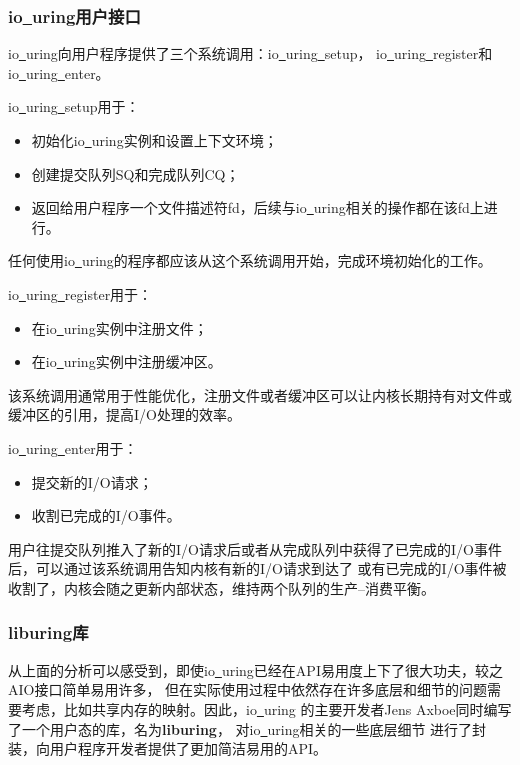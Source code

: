 \documentclass[supercite]{HustGraduPaper}
\theoremstyle{definition}
\begin{document}
\subsubsection{io\underline{~}uring用户接口}

io\underline{~}uring向用户程序提供了三个系统调用：io\underline{~}uring\underline{~}setup，
io\underline{~}uring\underline{~}register和io\underline{~}uring\underline{~}enter。\par

io\underline{~}uring\underline{~}setup用于：

\begin{itemize}
  \item 初始化io\underline{~}uring实例和设置上下文环境；
  \item 创建提交队列SQ和完成队列CQ；
  \item 返回给用户程序一个文件描述符fd，后续与io\underline{~}uring相关的操作都在该fd上进行。
\end{itemize}

任何使用io\underline{~}uring的程序都应该从这个系统调用开始，完成环境初始化的工作。\par

io\underline{~}uring\underline{~}register用于：
\begin{itemize}
  \item 在io\underline{~}uring实例中注册文件；
  \item 在io\underline{~}uring实例中注册缓冲区。
\end{itemize}

该系统调用通常用于性能优化，注册文件或者缓冲区可以让内核长期持有对文件或缓冲区的引用，提高I/O处理的效率。\par

io\underline{~}uring\underline{~}enter用于：
\begin{itemize}
  \item 提交新的I/O请求；
  \item 收割已完成的I/O事件。
\end{itemize}

用户往提交队列推入了新的I/O请求后或者从完成队列中获得了已完成的I/O事件后，可以通过该系统调用告知内核有新的I/O请求到达了
或有已完成的I/O事件被收割了，内核会随之更新内部状态，维持两个队列的生产--消费平衡。\par

\subsubsection{liburing库}
从上面的分析可以感受到，即使io\underline{~}uring已经在API易用度上下了很大功夫，较之AIO接口简单易用许多，
但在实际使用过程中依然存在许多底层和细节的问题需要考虑，比如共享内存的映射。因此，io\underline{~}uring
的主要开发者Jens Axboe同时编写了一个用户态的库，名为\textbf{liburing}，
对io\underline{~}uring相关的一些底层细节
进行了封装，向用户程序开发者提供了更加简洁易用的API。\par
\end{document}
